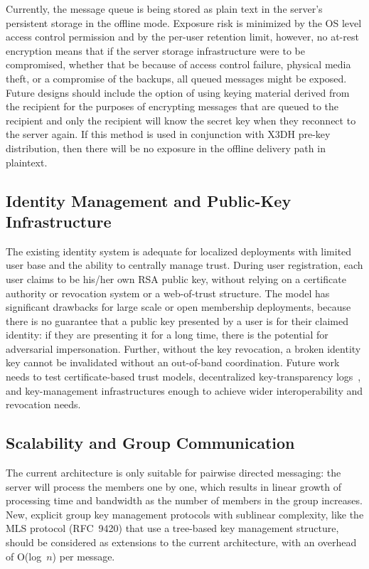 \documentclass[conference]{IEEEtran}
\begin{document}
Currently, the message queue is being stored as plain text in the server's persistent storage in the offline mode. Exposure risk is minimized by the OS level access control permission and by the per-user retention limit, however, no at-rest encryption means that if the server storage infrastructure were to be compromised, whether that be because of access control failure, physical media theft, or a compromise of the backups, all queued messages might be exposed. Future designs should include the option of using keying material derived from the recipient for the purposes of encrypting messages that are queued to the recipient and only the recipient will know the secret key when they reconnect to the server again. If this method is used in conjunction with X3DH pre-key distribution, then there will be no exposure in the offline delivery path in plaintext.

\subsection{Identity Management and Public-Key Infrastructure}

The existing identity system is adequate for localized deployments with limited user base and the ability to centrally manage trust. During user registration, each user claims to be his/her own RSA public key, without relying on a certificate authority or revocation system or a web-of-trust structure. The model has significant drawbacks for large scale or open membership deployments, because there is no guarantee that a public key presented by a user is for their claimed identity: if they are presenting it for a long time, there is the potential for adversarial impersonation. Further, without the key revocation, a broken identity key cannot be invalidated without an out-of-band coordination. Future work needs to test certificate-based trust models, decentralized key-transparency logs~\cite{b13}, and key-management infrastructures enough to achieve wider interoperability and revocation needs.

\subsection{Scalability and Group Communication}

The current architecture is only suitable for pairwise directed messaging: the server will process the members one by one, which results in linear growth of processing time and bandwidth as the number of members in the group increases. New, explicit group key management protocols with sublinear complexity, like the MLS protocol \cite{b5} (RFC~9420) that use a tree-based key management structure, should be considered as extensions to the current architecture, with an overhead of O(log~$n$) per message.
\end{document}
